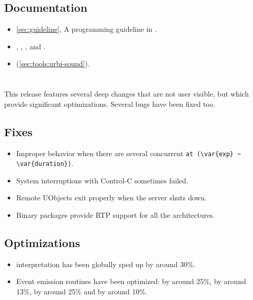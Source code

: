 \subsection{Documentation}
\begin{itemize}
\item \autoref{sec:guideline}, A programming guideline in \usdk.
\item {}, ,
  , and
  .
\item {} (\autoref{sec:tools:urbi-sound}).
\end{itemize}


\section{}

This release features several deep changes that are not user visible, but
which provide significant optimizations.  Several bugs have been fixed too.

\subsection{Fixes}
\begin{itemize}
\item Improper behavior when there are several concurrent
  \lstinline|at (\var{exp} ~ \var{duration})|.
\item System interruptions with Control-C sometimes failed.
\item Remote UObjects exit properly when the server shuts down.
\item Binary packages provide RTP support for all the architectures.
\end{itemize}

\subsection{Optimizations}
\begin{itemize}
\item \us interpretation has been globally sped up by around 30\%.
\item Event emission routines have been optimized:  by
  around 25\%,  by around 13\%,
   by around 25\% and 
  by around 10\%.
\end{itemize}

